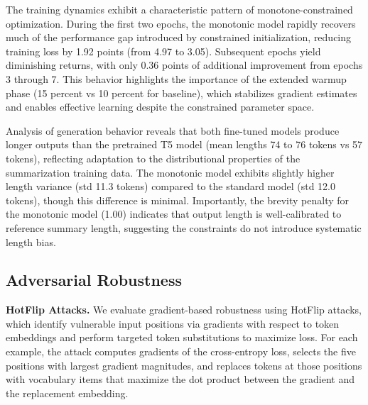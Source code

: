 \documentclass{article}
\theoremstyle{plain}
\theoremstyle{definition}
\theoremstyle{remark}
\begin{document}
\begin{table}[t]
\caption{Summarization quality on XSUM (n = 200, seed = 42). Values are means with 95\% bootstrap confidence intervals.}
\label{tab:xsum}
\vskip 0.1in
\centering
{}
\vskip -0.1in
\end{table}

The training dynamics exhibit a characteristic pattern of monotone-constrained optimization. During the first two epochs, the monotonic model rapidly recovers much of the performance gap introduced by constrained initialization, reducing training loss by 1.92 points (from 4.97 to 3.05). Subsequent epochs yield diminishing returns, with only 0.36 points of additional improvement from epochs 3 through 7. This behavior highlights the importance of the extended warmup phase (15 percent vs 10 percent for baseline), which stabilizes gradient estimates and enables effective learning despite the constrained parameter space.

Analysis of generation behavior reveals that both fine-tuned models produce longer outputs than the pretrained T5 model (mean lengths 74 to 76 tokens vs 57 tokens), reflecting adaptation to the distributional properties of the summarization training data. The monotonic model exhibits slightly higher length variance (std 11.3 tokens) compared to the standard model (std 12.0 tokens), though this difference is minimal. Importantly, the brevity penalty for the monotonic model (1.00) indicates that output length is well-calibrated to reference summary length, suggesting the constraints do not introduce systematic length bias.

\subsection{Adversarial Robustness}

\textbf{HotFlip Attacks.}
We evaluate gradient-based robustness using HotFlip attacks, which identify vulnerable input positions via gradients with respect to token embeddings and perform targeted token substitutions to maximize loss. For each example, the attack computes gradients of the cross-entropy loss, selects the five positions with largest gradient magnitudes, and replaces tokens at those positions with vocabulary items that maximize the dot product between the gradient and the replacement embedding.
\end{document}
